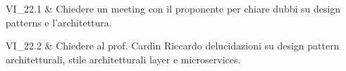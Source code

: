 VI\_22.1 & Chiedere un meeting con il proponente per chiare dubbi su design patterns e l'architettura.

\tabularnewline
VI\_22.2 & Chiedere al prof. Cardin Riccardo delucidazioni su design pattern architetturali, stile architetturali layer e microservices.


